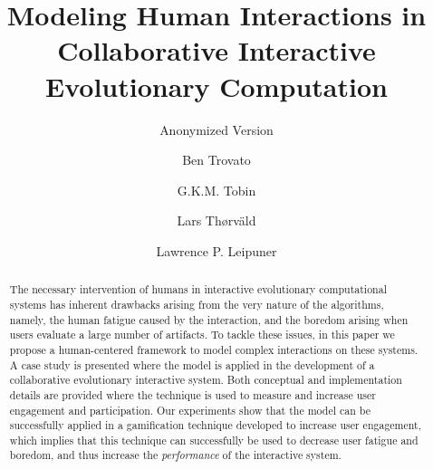 \documentclass[sigconf]{acmart}
\begin{document}
\title{Modeling Human Interactions in Collaborative Interactive 
 Evolutionary Computation}
\subtitle{Anonymized Version}


\author{Ben Trovato}

\author{G.K.M. Tobin}

\author{Lars Th{\o}rv{\"a}ld}

\author{Lawrence P. Leipuner}



\begin{abstract}
The necessary intervention of humans in interactive evolutionary
computational systems has inherent drawbacks arising from the very nature of 
the algorithms, namely, the human fatigue caused by the interaction, and
the boredom arising when users evaluate a large number of artifacts.
To tackle these issues, in this paper we
propose a human-centered framework to model complex interactions on these systems.
A case study is presented where the model is applied in the 
development of a collaborative evolutionary interactive system. 
Both conceptual and implementation details are provided where the   
technique is used to measure and increase user engagement and participation.
Our experiments show that the model can be successfully applied in a
gamification technique developed to increase user engagement, which
implies that this technique can successfully be used to 
decrease user fatigue and boredom, and thus increase the {\em performance} of the
interactive system.
\end{abstract}
\end{document}
